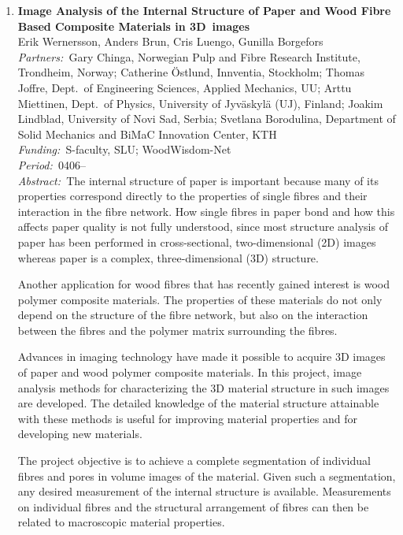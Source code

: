 \documentclass[10pt, a4paper]{article}
\newcommand{\aabstract}[1]{\emph{Abstract:~}#1}
\newcommand{\ffunding}[1]{\emph{Funding:~}#1\\}
\newcommand{\ppartners}[1]{\emph{Partners:~}#1\\}
\newcommand{\pperiod}[1]{\emph{Period:~}#1\\}
\begin{document}
\begin{enumerate}

\item 
\label{proj:paper}
\textbf{Image Analysis of the Internal Structure of Paper and Wood Fibre Based Composite Materials in 3D~images}\\%
Erik Wernersson, Anders Brun, Cris Luengo, Gunilla Borgefors\\
\ppartners{Gary Chinga, Norwegian Pulp and Fibre Research Institute, Trondheim, Norway;
Catherine \"{O}stlund, Innventia, Stockholm; Thomas Joffre, Dept.~of Engineering Sciences, Applied
Mechanics, UU; Arttu Miettinen, Dept.~of Physics, University of Jyv\"{a}skyl\"{a} (UJ), Finland;  Joakim Lindblad, University of Novi Sad, Serbia; Svetlana Borodulina, Department of Solid Mechanics and BiMaC Innovation Center, KTH
}
\ffunding{S-faculty, SLU; WoodWisdom-Net}
\pperiod{0406--}
\newpage
\aabstract{The internal structure of paper is important because many of its properties correspond directly to the properties of single
fibres and their interaction in the fibre network. How single fibres in paper bond and how this affects paper quality is not fully
understood, since most structure analysis of paper has been performed in cross-sectional, two-dimensional (2D) images whereas paper is a
complex, three-dimensional (3D) structure.

Another application for wood fibres that has recently gained interest is wood polymer composite materials. The properties of these materials
do not only depend on the structure of the fibre network, but also on the interaction between the fibres and the polymer matrix surrounding
the fibres.

Advances in imaging technology have made it possible to acquire 3D images of paper and wood polymer composite materials. In this project,
image analysis methods for characterizing the 3D material structure in such images are developed. The detailed knowledge of the material
structure attainable with these methods is useful for improving material properties and for developing new materials.

The project objective is to achieve a complete segmentation of individual fibres and pores in volume images of the material. Given such a segmentation, any desired measurement of the internal structure is available. Measurements on individual fibres and the structural
arrangement of fibres can then be related to macroscopic material properties.

}
\end{enumerate}
\end{document}
